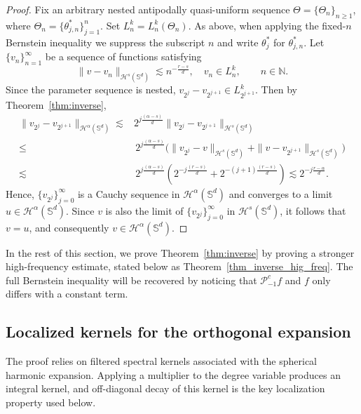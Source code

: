 \documentclass{article}
\numberwithin{equation}{section}
\def\NN{\mathbb{N}}
\def\SS{\mathbb{S}}
\def\pc{\mathcal{P}^c}
\begin{document}
\begin{proof}
Fix an arbitrary nested antipodally quasi-uniform sequence $\Theta=\{\Theta_n\}_{n\ge1}$, where $\Theta_n=\{\theta_{j,n}^*\}_{j=1}^n$. Set $L_n^k=L_n^k(\Theta_n)$. As above, when applying the fixed-$n$ Bernstein inequality we suppress the subscript $n$ and write $\theta_j^*$ for $\theta_{j,n}^*$. Let $\{v_n\}_{n=1}^\infty$ be a sequence of functions satisfying
\begin{equation}\label{eqn_appr_fN}
\|v-v_n\|_{\mathcal H^s(\SS^d)}\lesssim n^{-\frac{r-s}{d}},\quad v_n\in L_n^k,\qquad n\in\NN.
\end{equation}
Since the parameter sequence is nested, $v_{2^j}-v_{2^{j+1}}\in L_{2^{j+1}}^k$. Then by Theorem~\ref{thm:inverse},
\begin{equation*}
\begin{split}
\|v_{2^j}-v_{2^{j+1}}\|_{\mathcal H^\alpha(\SS^d)}\lesssim&2^{j\frac{(\alpha-s)}{d}}\|v_{2^j}-v_{2^{j+1}}\|_{\mathcal H^s(\SS^d)}\\
\leq&\,2^{j\frac{(\alpha-s)}{d}}\big(\|v_{2^j}-v\|_{\mathcal H^s(\SS^d)}+\|v-v_{2^{j+1}}\|_{\mathcal H^s(\SS^d)}\big)\\
\lesssim&\,2^{j\frac{(\alpha-s)}{d}}(2^{-j\frac{(r-s)}{d}}+2^{-(j+1)\frac{(r-s)}{d}})\lesssim2^{-j\frac{r-\alpha}{d}}.
\end{split}
\end{equation*}
Hence, $\{v_{2^j}\}_{j=0}^\infty$ is a Cauchy sequence in $\mathcal H^\alpha(\SS^d)$ and converges to a limit $u\in\mathcal H^\alpha(\SS^d)$. Since $v$ is also the limit of $\{v_{2^j}\}_{j=0}^\infty$ in $\mathcal H^s(\SS^d)$, it follows that $v=u$, and consequently $v\in\mathcal H^\alpha(\SS^d)$.
\end{proof}


In the rest of this section, we prove Theorem~\ref{thm:inverse} by proving a stronger high-frequency estimate, stated below as Theorem~\ref{thm_inverse_hig_freq}. The full Bernstein inequality will be recovered by noticing that $\pc_{-1}f$ and $f$ only differs with a constant term.

\subsection{Localized kernels for the orthogonal expansion}
The proof relies on filtered spectral kernels associated with the spherical harmonic expansion. Applying a multiplier to the degree variable produces an integral kernel, and off-diagonal decay of this kernel is the key localization property used below.
\end{document}
